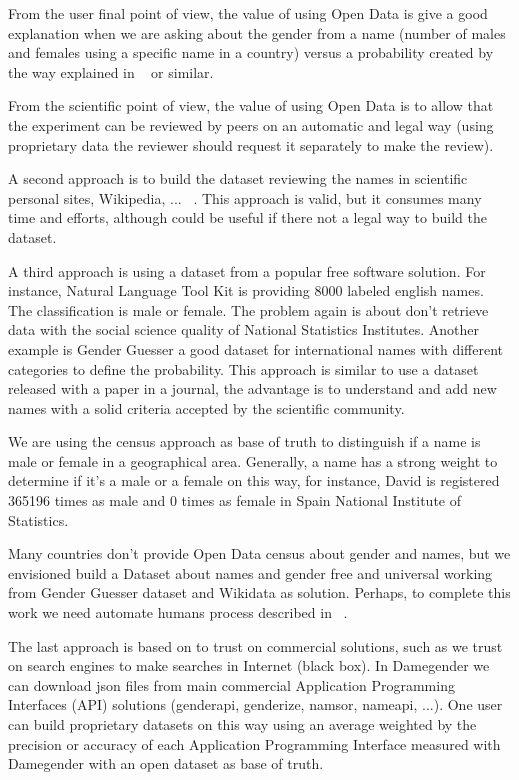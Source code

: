 \documentclass[a4paper]{article}
\begin{document}
From the user final point of view, the value of using Open Data is
give a good explanation when we are asking about the gender from a
name (number of males and females using a specific name in a country)
versus a probability created by the way explained in
~\cite{10.7717/peerj-cs.156} or similar.

From the scientific point of view, the value of using Open Data is to
allow that the experiment can be reviewed by peers on an automatic and
legal way (using proprietary data the reviewer should request it
separately to make the review).

A second approach is to build the dataset reviewing the names in
scientific personal sites, Wikipedia,
... ~\cite{10.7717/peerj-cs.156}. This approach is valid, but it
consumes many time and efforts, although could be useful if there not
a legal way to build the dataset.

A third approach is using a dataset from a popular free software
solution. For instance, Natural Language Tool Kit is providing 8000
labeled english names. The classification is male or female. The
problem again is about don't retrieve data with the social science
quality of National Statistics Institutes. Another example is Gender
Guesser a good dataset for international names with different
categories to define the probability. This approach is similar to use
a dataset released with a paper in a journal, the advantage is to
understand and add new names with a solid criteria accepted by the
scientific community.

We are using the census approach as base of truth to distinguish if a
name is male or female in a geographical area. Generally, a name has a
strong weight to determine if it's a male or a female on this way, for
instance, David is registered 365196 times as male and 0 times as
female in Spain National Institute of Statistics.

Many countries don't provide Open Data census about gender and names,
but we envisioned build a Dataset about names and gender free and
universal working from Gender Guesser dataset and Wikidata as
solution. Perhaps, to complete this work we need automate humans
process described in ~\cite{10.7717/peerj-cs.156}.

The last approach is based on to trust on commercial solutions, such
as we trust on search engines to make searches in Internet (black
box).  In Damegender we can download json files from main commercial
Application Programming Interfaces (API) solutions (genderapi,
genderize, namsor, nameapi, ...). One user can build proprietary
datasets on this way using an average weighted by the precision or
accuracy of each Application Programming Interface measured with
Damegender with an open dataset as base of truth.
\end{document}
